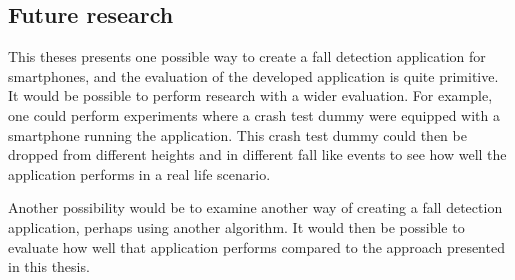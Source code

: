 \documentclass[12pt, a4paper, onecolumn]{article}
\begin{document}
	\subsection{Future research}
	
	This theses presents one possible way to create a fall detection application for smartphones, and the evaluation of the developed application is quite primitive. It would be possible to perform research with a wider evaluation. For example, one could perform experiments where a crash test dummy were equipped with a smartphone running the application. This crash test dummy could then be dropped from different heights and in different fall like events to see how well the application performs in a real life scenario.
	
	Another possibility would be to examine another way of creating a fall detection application, perhaps using another algorithm. It would then be possible to evaluate how well that application performs compared to the approach presented in this thesis.
	
	\newpage
		
	
	
\end{document}
